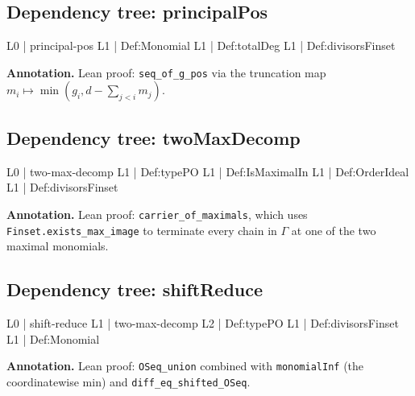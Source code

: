 \documentclass[11pt,reqno]{amsart}
\begin{document}
\medskip

\subsection*{Dependency tree: \textsf{principalPos}}

\noindent%
\begin{minipage}[t]{0.48\linewidth}
	\vspace{0pt}
	\begin{verbatimbox}
		L0 | principal-pos
		L1 |   Def:Monomial
		L1 |   Def:totalDeg
		L1 |   Def:divisorsFinset
	\end{verbatimbox}
\end{minipage}\hfill 
\begin{minipage}[t]{0.48\linewidth}
	\vspace{0pt}
	\textbf{Annotation.} Lean proof: \texttt{seq\_of\_g\_pos} via the truncation map $m_{i}\mapsto\min(g_{i},d-\sum_{j<i}m_{j})$.
\end{minipage}

\medskip

\subsection*{Dependency tree: \textsf{twoMaxDecomp}}

\noindent%
\begin{minipage}[t]{0.48\linewidth}
	\vspace{0pt}
	\begin{verbatimbox}
		L0 | two-max-decomp
		L1 |   Def:typePO
		L1 |   Def:IsMaximalIn
		L1 |   Def:OrderIdeal
		L1 |   Def:divisorsFinset
	\end{verbatimbox}
\end{minipage}\hfill 
\begin{minipage}[t]{0.48\linewidth}
	\vspace{0pt}
	\textbf{Annotation.} Lean proof: \texttt{carrier\_of\_maximals}, which uses \texttt{Finset.exists\_max\_image} to terminate every chain in $\Gamma$ at one of the two maximal monomials.
\end{minipage}

\medskip

\subsection*{Dependency tree: \textsf{shiftReduce}}

\noindent%
\begin{minipage}[t]{0.48\linewidth}
	\vspace{0pt}
	\begin{verbatimbox}
		L0 | shift-reduce
		L1 |   two-max-decomp
		L2 |     Def:typePO
		L1 |   Def:divisorsFinset
		L1 |   Def:Monomial
	\end{verbatimbox}
\end{minipage}\hfill 
\begin{minipage}[t]{0.48\linewidth}
	\vspace{0pt}
	\textbf{Annotation.} Lean proof: \texttt{OSeq\_union} combined with \texttt{monomialInf} (the coordinatewise min) and \texttt{diff\_eq\_shifted\_OSeq}.
\end{minipage}
\end{document}
